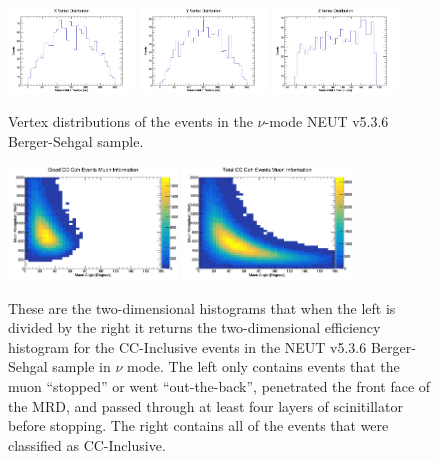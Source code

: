 \documentclass[11pt]{article}
\begin{document}
\begin{figure}[H]
\centering
\includegraphics[width=0.3\textwidth]{NewNMBergerSehgalImages/4-XVertexDistributionNMBS.png}
\includegraphics[width=0.3\textwidth]{NewNMBergerSehgalImages/3-YVertexDistributionNMBS.png}
\includegraphics[width=0.3\textwidth]{NewNMBergerSehgalImages/2-ZVertexDistributionNMBS.png}
\caption{Vertex distributions of the events in the $\nu$-mode NEUT v5.3.6 Berger-Sehgal sample.}
\label{fig:app:NMVertexDistributionBS}
\end{figure}

\begin{figure}[H]
\centering
\includegraphics[width=0.4\textwidth]{NewNMBergerSehgalImages/6-GoodCCCohMuonInfoNMBS.png}
\includegraphics[width=0.4\textwidth]{NewNMBergerSehgalImages/9-TotalCCCohMuonInfoNMBS.png}
\caption{These are the two-dimensional histograms that when the left is divided by the right it returns the two-dimensional efficiency histogram for the CC-Inclusive events in the NEUT v5.3.6 Berger-Sehgal sample in $\nu$ mode. The left only contains events that the muon ``stopped'' or went ``out-the-back'', penetrated the front face of the MRD, and passed through at least four layers of scinitillator before stopping. The right contains all of the events that were classified as CC-Inclusive.}
\label{fig:app:NMCCInclusiveMuon2DBS}
\end{figure}
\end{document}
